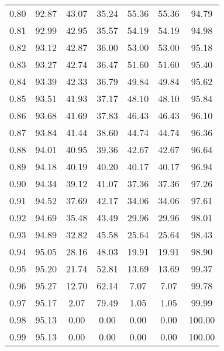 \begin{tabular}{|c|c|c|c|c|c|c|}
      0.80 &     92.87 &     43.07 &      35.24 &   55.36 &      55.36 &         94.79 \\
      0.81 &     92.99 &     42.95 &      35.57 &   54.19 &      54.19 &         94.98 \\
      0.82 &     93.12 &     42.87 &      36.00 &   53.00 &      53.00 &         95.18 \\
      0.83 &     93.27 &     42.74 &      36.47 &   51.60 &      51.60 &         95.40 \\
      0.84 &     93.39 &     42.33 &      36.79 &   49.84 &      49.84 &         95.62 \\
      0.85 &     93.51 &     41.93 &      37.17 &   48.10 &      48.10 &         95.84 \\
      0.86 &     93.68 &     41.69 &      37.83 &   46.43 &      46.43 &         96.10 \\
      0.87 &     93.84 &     41.44 &      38.60 &   44.74 &      44.74 &         96.36 \\
      0.88 &     94.01 &     40.95 &      39.36 &   42.67 &      42.67 &         96.64 \\
      0.89 &     94.18 &     40.19 &      40.20 &   40.17 &      40.17 &         96.94 \\
      0.90 &     94.34 &     39.12 &      41.07 &   37.36 &      37.36 &         97.26 \\
      0.91 &     94.52 &     37.69 &      42.17 &   34.06 &      34.06 &         97.61 \\
      0.92 &     94.69 &     35.48 &      43.49 &   29.96 &      29.96 &         98.01 \\
      0.93 &     94.89 &     32.82 &      45.58 &   25.64 &      25.64 &         98.43 \\
      0.94 &     95.05 &     28.16 &      48.03 &   19.91 &      19.91 &         98.90 \\
      0.95 &     95.20 &     21.74 &      52.81 &   13.69 &      13.69 &         99.37 \\
      0.96 &     95.27 &     12.70 &      62.14 &    7.07 &       7.07 &         99.78 \\
      0.97 &     95.17 &      2.07 &      79.49 &    1.05 &       1.05 &         99.99 \\
      0.98 &     95.13 &      0.00 &       0.00 &    0.00 &       0.00 &        100.00 \\
      0.99 &     95.13 &      0.00 &       0.00 &    0.00 &       0.00 &        100.00 \\
\bottomrule
\end{tabular}

